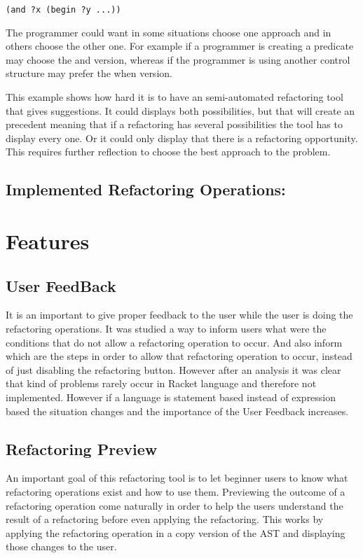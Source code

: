 \begin{lstlisting}[basicstyle=\ttfamily, caption="Example"]
(and ?x (begin ?y ...))
\end{lstlisting}

The programmer could want in some situations choose one approach and in others
choose the other one. For example if a programmer is creating a predicate may
choose the and version, whereas if the programmer is using another control structure
may prefer the when version.

This example shows how hard it is to have an semi-automated refactoring tool
that gives suggestions.
It could displays both possibilities, but that will create an precedent meaning
that if a refactoring has several possibilities the tool has to display every one.
Or it could only display that there is a refactoring opportunity.
This requires further reflection to choose the best approach to the problem.


\subsection{Implemented Refactoring Operations:}

\section{Features}

\subsection{User FeedBack}
It is an important to give proper feedback to the user while the user is doing
the refactoring operations.
It was studied a way to inform users what were the conditions that do not allow
a refactoring operation to occur.
And also inform which are the steps in order to allow that refactoring operation to occur,
instead of just disabling the refactoring button.
However after an analysis it was clear that kind of problems rarely occur
in Racket language and therefore not implemented.
However if a language is statement based instead of expression based the situation changes
and the importance of the User Feedback increases.

\subsection{Refactoring Preview}
An important goal of this refactoring tool is to let beginner users to know what
refactoring operations exist and how to use them.
Previewing the outcome of a refactoring operation come naturally in order to
help the users understand the result of a refactoring before even applying the refactoring.
This works by applying the refactoring operation in a copy version of the AST
and displaying those changes to the user.

